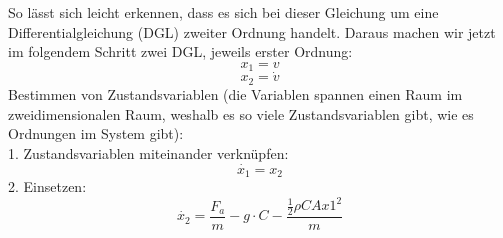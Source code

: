 So lässt sich leicht erkennen, dass es sich bei dieser Gleichung um eine Differentialgleichung (DGL) zweiter Ordnung handelt. Daraus machen wir jetzt im folgendem Schritt zwei DGL, jeweils erster Ordnung:
\begin{equation}
 x_1=v 
\end{equation}
\begin{equation}
  x_2=\dot{v} 
\end{equation}
Bestimmen von Zustandsvariablen (die Variablen spannen einen Raum im zweidimensionalen Raum, weshalb es so viele Zustandsvariablen gibt, wie es Ordnungen im System gibt):\\
1. Zustandsvariablen miteinander verknüpfen:
\begin{equation}
  \dot{x_1} = x_2 
\end{equation}
2. Einsetzen:
\begin{equation}
  \dot{x_2} = \frac{F_a}{m} -  g\cdot C - \frac{\frac{1}{2}\rho C A {x1}^{2}}{m} 
\end{equation}



